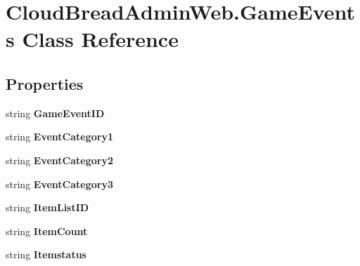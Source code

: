 \hypertarget{a00083}{}\section{Cloud\+Bread\+Admin\+Web.\+Game\+Events Class Reference}
\label{a00083}
\subsection*{Properties}
\begin{DoxyCompactItemize}
\item 
string {\bfseries Game\+Event\+ID}\hypertarget{a00083_a268d00ee35fbd04145b0d8f83666a251}{}\label{a00083_a268d00ee35fbd04145b0d8f83666a251}

\item 
string {\bfseries Event\+Category1}\hypertarget{a00083_aec2eb4874edadd56e566c8bbae7768bc}{}\label{a00083_aec2eb4874edadd56e566c8bbae7768bc}

\item 
string {\bfseries Event\+Category2}\hypertarget{a00083_a1dee1ebbb9c7f04926b19801b5ecd4be}{}\label{a00083_a1dee1ebbb9c7f04926b19801b5ecd4be}

\item 
string {\bfseries Event\+Category3}\hypertarget{a00083_adad11dbf67ceb0b69e7d291dfd81ee76}{}\label{a00083_adad11dbf67ceb0b69e7d291dfd81ee76}

\item 
string {\bfseries Item\+List\+ID}\hypertarget{a00083_ae12f6bea81a91fe610959f53a34e38e5}{}\label{a00083_ae12f6bea81a91fe610959f53a34e38e5}

\item 
string {\bfseries Item\+Count}\hypertarget{a00083_a7b10e9d608a231fcde95ebb4dfe405cb}{}\label{a00083_a7b10e9d608a231fcde95ebb4dfe405cb}

\item 
string {\bfseries Itemstatus}\hypertarget{a00083_aa624fefe1023a5d10d9fd9b5965254e1}{}\label{a00083_aa624fefe1023a5d10d9fd9b5965254e1}


\end{DoxyCompactItemize}
